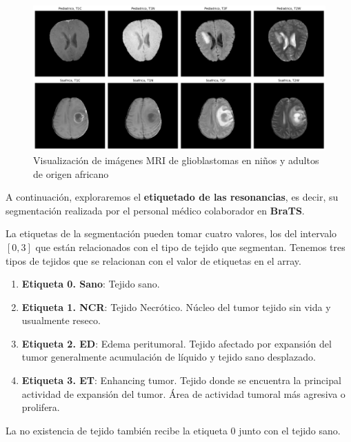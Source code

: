 \begin{figure}[!h]
	\centering
	\includegraphics[width=1.0\linewidth]{imagenes/imgSSAPEDMRI.png}
	\caption{Visualización de imágenes MRI de glioblastomas en niños y adultos de origen africano}
	\label{fig:visual1}
\end{figure}

\newpage

A continuación, exploraremos el \textbf{etiquetado de las resonancias}, es decir, su segmentación realizada por el personal médico colaborador en \textbf{BraTS}.

La etiquetas de la segmentación pueden tomar cuatro valores, los del intervalo $[0, 3]$ que están relacionados con el tipo de tejido que segmentan. Tenemos tres tipos de tejidos que se relacionan con el valor de etiquetas en el array.

\begin{enumerate}
	\item \textbf{Etiqueta 0. Sano}: Tejido sano.
	\item \textbf{Etiqueta 1. NCR}: Tejido Necrótico. Núcleo del tumor tejido sin vida y usualmente reseco.
	\item \textbf{Etiqueta 2. ED}: Edema peritumoral. Tejido afectado por expansión del tumor generalmente acumulación de líquido y tejido sano desplazado. 
	\item \textbf{Etiqueta 3. ET}: Enhancing tumor. Tejido donde se encuentra la principal actividad de expansión del tumor. Área de actividad tumoral más agresiva o prolifera.
\end{enumerate}

La no existencia de tejido también recibe la etiqueta 0 junto con el tejido sano.

